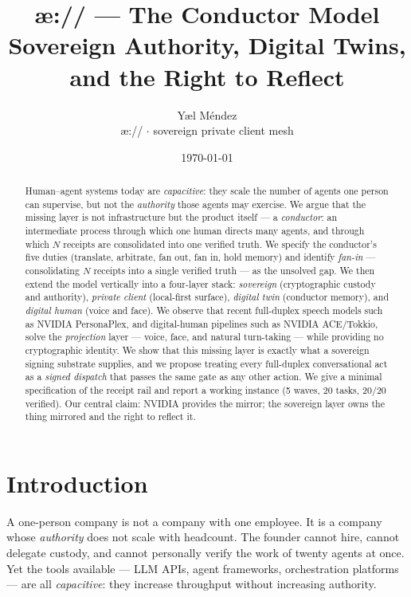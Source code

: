 \documentclass[11pt]{article}
\title{\textbf{\ae:// --- The Conductor Model}\\[4pt]
\large Sovereign Authority, Digital Twins, and the Right to Reflect}
\author{Y\ae l M\'endez\\ \small \ae:// $\cdot$ sovereign private client mesh}
\date{\today}
\begin{document}
\maketitle

\begin{abstract}
Human--agent systems today are \emph{capacitive}: they scale the number of agents
one person can supervise, but not the \emph{authority} those agents may exercise.
We argue that the missing layer is not infrastructure but the product itself --- a
\emph{conductor}: an intermediate process through which one human directs many
agents, and through which $N$ receipts are consolidated into one verified truth. We
specify the conductor's five duties (translate, arbitrate, fan out, fan in, hold
memory) and identify \emph{fan-in} --- consolidating $N$ receipts into a single
verified truth --- as the unsolved gap. We then extend the model vertically into a
four-layer stack: \emph{sovereign} (cryptographic custody and authority),
\emph{private client} (local-first surface), \emph{digital twin} (conductor
memory), and \emph{digital human} (voice and face). We observe that recent
full-duplex speech models such as NVIDIA PersonaPlex, and digital-human pipelines
such as NVIDIA ACE/Tokkio, solve the \emph{projection} layer --- voice, face, and
natural turn-taking --- while providing no cryptographic identity. We show that
this missing layer is exactly what a sovereign signing substrate supplies, and we
propose treating every full-duplex conversational act as a \emph{signed dispatch}
that passes the same gate as any other action. We give a minimal specification of
the receipt rail and report a working instance (5 waves, 20 tasks, 20/20 verified).
Our central claim: NVIDIA provides the mirror; the sovereign layer owns the thing
mirrored and the right to reflect it.
\end{abstract}

\section{Introduction}

A one-person company is not a company with one employee. It is a company whose
\emph{authority} does not scale with headcount. The founder cannot hire, cannot
delegate custody, and cannot personally verify the work of twenty agents at once.
Yet the tools available --- LLM APIs, agent frameworks, orchestration platforms ---
are all \emph{capacitive}: they increase throughput without increasing authority.
\end{document}
